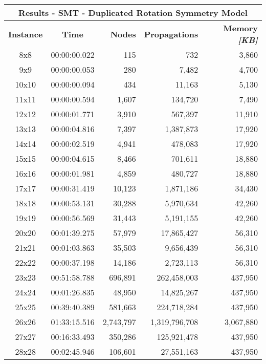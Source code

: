 
\begin{center}
    \begin{tabular}{|c|c|r|r|r|}
        \hline
        \multicolumn{5}{|c|}{\textbf{Results - SMT - Duplicated Rotation Symmetry Model}} \\
        \hline
        \textbf{Instance} & \textbf{Time} & \textbf{Nodes} & \textbf{Propagations} & \textbf{Memory \textit{[KB]}} \\
        
        \hline
		8x8 & 00:00:00.022 & 115 & 732 & 3,860 \\ \hline
		9x9 & 00:00:00.053 & 280 & 7,482 & 4,700 \\ \hline
		10x10 & 00:00:00.094 & 434 & 11,163 & 5,130 \\ \hline
		11x11 & 00:00:00.594 & 1,607 & 134,720 & 7,490 \\ \hline
		12x12 & 00:00:01.771 & 3,910 & 567,397 & 11,910 \\ \hline
		13x13 & 00:00:04.816 & 7,397 & 1,387,873 & 17,920 \\ \hline
		14x14 & 00:00:02.519 & 4,941 & 478,083 & 17,920 \\ \hline
		15x15 & 00:00:04.615 & 8,466 & 701,611 & 18,880 \\ \hline
		16x16 & 00:00:01.981 & 4,859 & 480,727 & 18,880 \\ \hline
		17x17 & 00:00:31.419 & 10,123 & 1,871,186 & 34,430 \\ \hline
		18x18 & 00:00:53.131 & 30,288 & 5,970,634 & 42,260 \\ \hline
		19x19 & 00:00:56.569 & 31,443 & 5,191,155 & 42,260 \\ \hline
		20x20 & 00:01:39.275 & 57,979 & 17,865,427 & 56,310 \\ \hline
		21x21 & 00:01:03.863 & 35,503 & 9,656,439 & 56,310 \\ \hline
		22x22 & 00:00:37.198 & 14,186 & 2,723,113 & 56,310 \\ \hline
		23x23 & 00:51:58.788 & 696,891 & 262,458,003 & 437,950 \\ \hline
		24x24 & 00:01:26.835 & 48,950 & 14,825,267 & 437,950 \\ \hline
		25x25 & 00:39:40.389 & 581,663 & 224,718,284 & 437,950 \\ \hline
		26x26 & 01:33:15.516 & 2,743,797 & 1,319,796,708 & 3,067,880 \\ \hline
		27x27 & 00:16:33.493 & 350,286 & 125,921,478 & 437,950 \\ \hline
		28x28 & 00:02:45.946 & 106,601 & 27,551,163 & 437,950 \\ \hline

\end{tabular}
\end{center}
